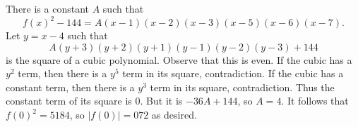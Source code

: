 There is a constant $A$ such that \[f(x)^2-144=A(x-1)(x-2)(x-3)(x-5)(x-6)(x-7).\] Let $y=x-4$ such that \[A(y+3)(y+2)(y+1)(y-1)(y-2)(y-3)+144\] is the square of a cubic polynomial. Observe that this is even. If the cubic has a $y^2$ term, then there is a $y^5$ term in its square, contradiction. If the cubic has a constant term, then there is a $y^3$ term in its square, contradiction. Thus the constant term of its square is $0$. But it is $-36A+144$, so $A=4$. It follows that $f(0)^2=5184$, so $|f(0)|=\boxed{072}$ as desired.